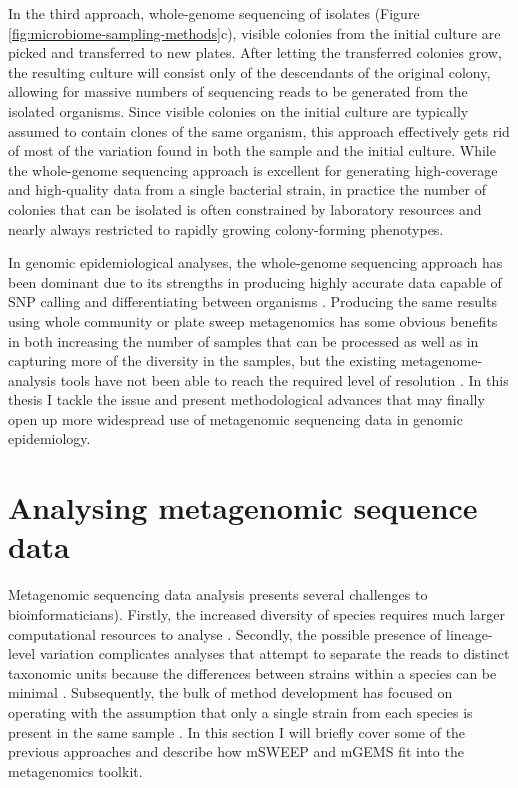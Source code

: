 \documentclass[officiallayout]{tktla}
\begin{document}
In the third approach, whole-genome sequencing of isolates (Figure
\ref{fig:microbiome-sampling-methods}c), visible colonies from the
initial culture are picked and transferred to new plates. After
letting the transferred colonies grow, the resulting culture will
consist only of the descendants of the original colony, allowing for
massive numbers of sequencing reads to be generated from the isolated
organisms. Since visible colonies on the initial culture are typically
assumed to contain clones of the same organism, this approach
effectively gets rid of most of the variation found in both the sample
and the initial culture. While the whole-genome sequencing approach is
excellent for generating high-coverage and high-quality data from a
single bacterial strain, in practice the number of colonies that can
be isolated is often constrained by laboratory resources and nearly
always restricted to rapidly growing colony-forming phenotypes.

In genomic epidemiological analyses, the whole-genome sequencing
approach has been dominant due to its strengths in producing highly
accurate data capable of SNP calling and differentiating between
organisms \citep{efsa2019whole}. Producing the same results using
whole community or plate sweep metagenomics has some obvious benefits
in both increasing the number of samples that can be processed as well
as in capturing more of the diversity in the samples, but the existing
metagenome-analysis tools have not been able to reach the required
level of resolution \citep{sczyrba2017critical,
  mcintyre2017comprehensive, maklin_bacterial_2021}. In this thesis I
tackle the issue and present methodological advances that may finally
open up more widespread use of metagenomic sequencing data in genomic
epidemiology.

\section{Analysing metagenomic sequence data}

Metagenomic sequencing data analysis presents several challenges to
bioinformaticians). Firstly, the increased diversity of species
requires much larger computational resources to analyse
\citep{yang2021review}. Secondly, the possible presence of
lineage-level variation complicates analyses that attempt to separate
the reads to distinct taxonomic units because the differences between
strains within a species can be minimal
\citep{meyer2022critical}. Subsequently, the bulk of method
development has focused on operating with the assumption that only a
single strain from each species is present in the same sample
\citep{breitwieser2019review}. In this section I will briefly cover
some of the previous approaches and describe how mSWEEP and mGEMS fit
into the metagenomics toolkit.
\end{document}
